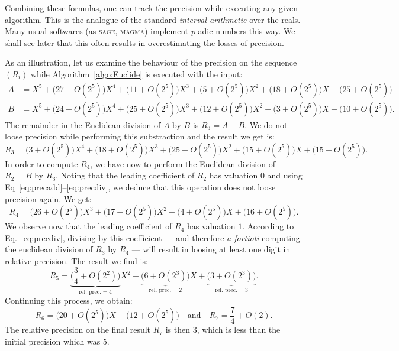 \documentclass{article}
\begin{document}

\noindent
Combining these formulas, one can track the precision while executing 
any given algorithm. This is the analogue of the standard \emph{interval 
arithmetic} over the reals. Many usual softwares (as \textsc{sage}, 
\textsc{magma}) implement $p$-adic numbers this way. We shall see later
that this often results in overestimating the losses of precision.

\begin{ex}
\label{ex:Euclide}
As an illustration, let us examine the behaviour of the precision
on the sequence $(R_i)$ while Algorithm~\ref{algo:Euclide} is
executed with the input:
\begin{align*}
A & = X^5 + 
      \big(27 + O(2^5)\big) X^4 +
      \big(11 + O(2^5)\big) X^3 +
      \big(5 + O(2^5)\big) X^2 +
      \big(18 + O(2^5)\big) X +
      \big(25 + O(2^5)\big) \\
B & = X^5 + 
      \big(24 + O(2^5)\big) X^4 +
      \big(25 + O(2^5)\big) X^3 +
      \big(12 + O(2^5)\big) X^2 +
      \big(3 + O(2^5)\big) X +
      \big(10 + O(2^5)\big).
\end{align*}
The remainder in the Euclidean division of $A$ by $B$ is $R_3 = A-B$.
We do not loose precision while performing this substraction and the
result we get is:
$$R_3 = 
      \big(3 + O(2^5)\big) X^4 +
      \big(18 + O(2^5)\big) X^3 +
      \big(25 + O(2^5)\big) X^2 +
      \big(15 + O(2^5)\big) X +
      \big(15 + O(2^5)\big).$$ 
In order to compute $R_4$, we have now to perform the Euclidean division 
of $R_2 = B$ by $R_3$. Noting that the leading coefficient of $R_2$ has 
valuation $0$ and using Eq~\eqref{eq:precadd}--\eqref{eq:precdiv}, we 
deduce that this operation does not loose precision again. We get:
$$R_4 = 
      \big(26 + O(2^5)\big) X^3 +
      \big(17 + O(2^5)\big) X^2 +
      \big(4 + O(2^5)\big) X +
      \big(16 + O(2^5)\big).$$
We observe now that the leading coefficient of $R_4$ has valuation $1$. 
According to Eq.~\eqref{eq:precdiv}, divising by this coefficient ---
and therefore \emph{a fortioti} computing the euclidean division of 
$R_3$ by $R_4$ --- will result in loosing at least one digit in
relative precision. The result we find is:
$$R_5 = 
      \underbrace{\big(\textstyle \frac 3 4 + O(2^2)\big)}_{\text{rel. prec.} = 4} X^2 +
      \underbrace{\big(6 + O(2^3)\big)}_{\text{rel. prec.} = 2} X +
      \underbrace{\big(3 + O(2^3)\big)}_{\text{rel. prec.} = 3}.$$
Continuing this process, we obtain:
$$R_6 = 
      \big(20 + O(2^5)\big) X +
      \big(12 + O(2^5)\big) 
\quad \text{and} \quad
R_7 =
      \textstyle \frac 7 4 + O(2).$$
The relative precision on the final result $R_7$ is then $3$, which is
less than the initial precision which was $5$.
\end{ex}
\end{document}
